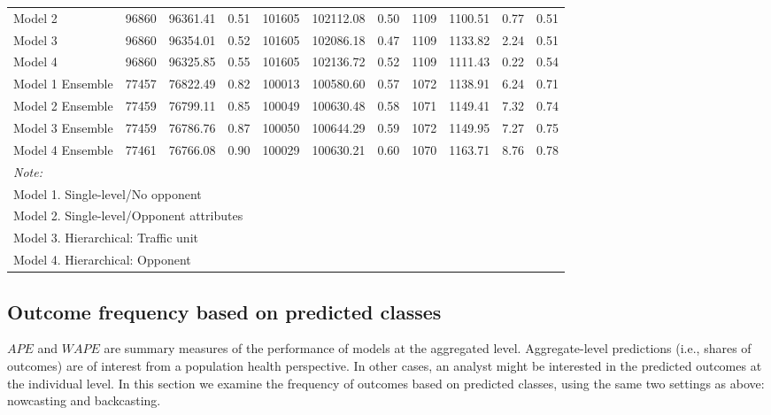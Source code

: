 \documentclass[]{elsarticle} %
\begin{document}
\begin{table}
\begin{tabular}[t]{lrrrrrrrrrr}
\rowcolor{gray!15}
\hspace{1em}Model 2 & 96860 & 96361.41 & 0.51 & 101605 & 102112.08 & 0.50 & 1109 & 1100.51 & 0.77 & 0.51\\
\hspace{1em}Model 3 & 96860 & 96354.01 & 0.52 & 101605 & 102086.18 & 0.47 & 1109 & 1133.82 & 2.24 & 0.51\\
\rowcolor{gray!15}
\hspace{1em}Model 4 & 96860 & 96325.85 & 0.55 & 101605 & 102136.72 & 0.52 & 1109 & 1111.43 & 0.22 & 0.54\\
\hspace{1em}Model 1 Ensemble & 77457 & 76822.49 & 0.82 & 100013 & 100580.60 & 0.57 & 1072 & 1138.91 & 6.24 & 0.71\\
\rowcolor{gray!15}
\hspace{1em}Model 2 Ensemble & 77459 & 76799.11 & 0.85 & 100049 & 100630.48 & 0.58 & 1071 & 1149.41 & 7.32 & 0.74\\
\hspace{1em}Model 3 Ensemble & 77459 & 76786.76 & 0.87 & 100050 & 100644.29 & 0.59 & 1072 & 1149.95 & 7.27 & 0.75\\
\rowcolor{gray!15}
Model 4 Ensemble & 77461 & 76766.08 & 0.90 & 100029 & 100630.21 & 0.60 & 1070 & 1163.71 & 8.76 & 0.78\\
\bottomrule
\multicolumn{11}{l}{\textit{Note: }}\\
\multicolumn{11}{l}{Model 1. Single-level/No opponent}\\
\multicolumn{11}{l}{Model 2. Single-level/Opponent attributes}\\
\multicolumn{11}{l}{Model 3. Hierarchical: Traffic unit}\\
\multicolumn{11}{l}{Model 4. Hierarchical: Opponent}\\
\end{tabular}
\end{table}

\hypertarget{sec:outcomes-classes}{%
\subsection{Outcome frequency based on predicted
classes}\label{sec:outcomes-classes}}

\(APE\) and \(WAPE\) are summary measures of the performance of models
at the aggregated level. Aggregate-level predictions (i.e., shares of
outcomes) are of interest from a population health perspective. In other
cases, an analyst might be interested in the predicted outcomes at the
individual level. In this section we examine the frequency of outcomes
based on predicted classes, using the same two settings as above:
nowcasting and backcasting.
\end{document}
